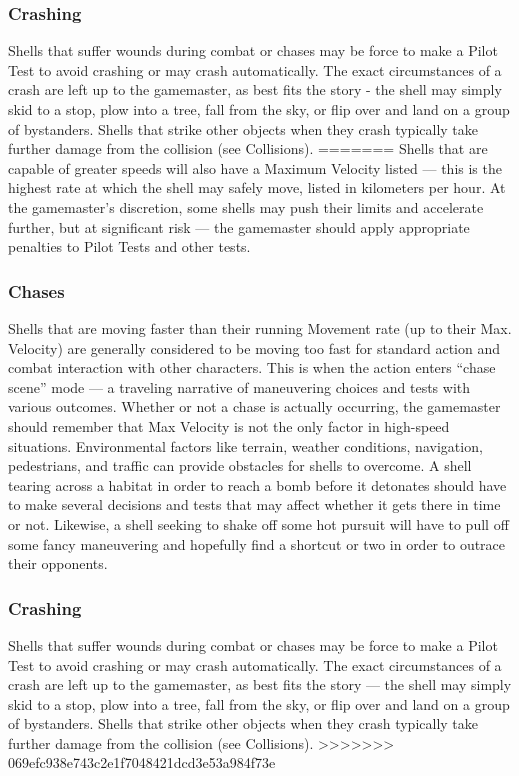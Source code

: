 \subsubsection{Crashing} 

Shells that suffer wounds during combat or chases may be force to make a Pilot Test to avoid crashing or may crash automatically. The exact circumstances of a crash are left up to the gamemaster, as best fits the story - the shell may simply skid to a stop, plow into a tree, fall from the sky, or flip over and land on a group of bystanders. Shells that strike other objects when they crash typically take further damage from the collision (see Collisions). ======= Shells that are capable of greater speeds will also have a Maximum Velocity listed --- this is the highest rate at which the shell may safely move, listed in kilometers per hour. At the gamemaster’s discretion, some shells may push their limits and accelerate further, but at significant risk --- the gamemaster should apply appropriate penalties to Pilot Tests and other tests. 

\subsubsection{Chases} 

Shells that are moving faster than their running Movement rate (up to their Max. Velocity) are generally considered to be moving too fast for standard action and combat interaction with other characters. This is when the action enters ``chase scene'' mode --- a traveling narrative of maneuvering choices and tests with various outcomes. Whether or not a chase is actually occurring, the gamemaster should remember that Max Velocity is not the only factor in high-speed situations. Environmental factors like terrain, weather conditions, navigation, pedestrians, and traffic can provide obstacles for shells to overcome. A shell tearing across a habitat in order to reach a bomb before it detonates should have to make several decisions and tests that may affect whether it gets there in time or not. Likewise, a shell seeking to shake off some hot pursuit will have to pull off some fancy maneuvering and hopefully find a shortcut or two in order to outrace their opponents. 

\subsubsection{Crashing} 

Shells that suffer wounds during combat or chases may be force to make a Pilot Test to avoid crashing or may crash automatically. The exact circumstances of a crash are left up to the gamemaster, as best fits the story --- the shell may simply skid to a stop, plow into a tree, fall from the sky, or flip over and land on a group of bystanders. Shells that strike other objects when they crash typically take further damage from the collision (see Collisions). >>>>>>> 069efc938e743c2e1f7048421dcd3e53a984f73e 

